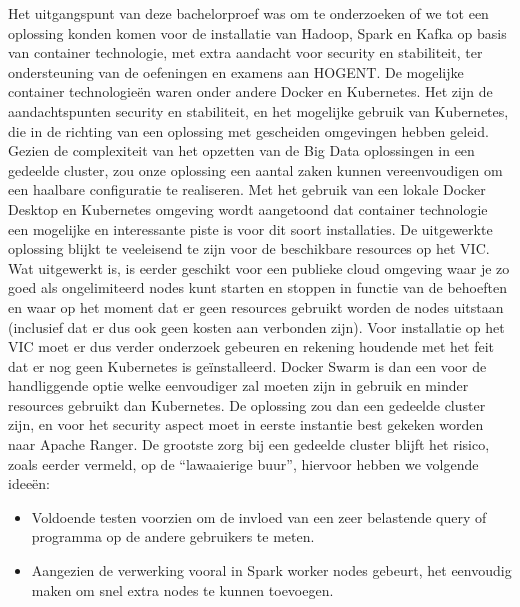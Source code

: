 Het uitgangspunt van deze bachelorproef was om te onderzoeken of we tot een oplossing konden komen voor de installatie van Hadoop, Spark en Kafka op basis van container technologie, met extra aandacht voor security en stabiliteit, ter ondersteuning van de oefeningen en examens aan HOGENT.
\newline
De mogelijke container technologieën waren onder andere Docker en Kubernetes.
\newline
\newline
Het zijn de aandachtspunten security en stabiliteit, en het mogelijke gebruik van Kubernetes, die in de richting van een oplossing met gescheiden omgevingen hebben geleid. 
\newline
\newline
Gezien de complexiteit van het opzetten van de Big Data oplossingen in een gedeelde cluster, zou onze oplossing een aantal zaken kunnen
vereenvoudigen om een haalbare configuratie te realiseren.
\newline
\newline
Met het gebruik van een lokale Docker Desktop en Kubernetes omgeving wordt aangetoond dat container technologie een mogelijke en interessante piste is voor dit soort installaties.
\newline
\newline
De uitgewerkte oplossing blijkt te veeleisend te zijn voor de beschikbare resources op het VIC. Wat uitgewerkt is, is eerder geschikt voor een publieke cloud omgeving waar je zo goed als ongelimiteerd nodes kunt starten en stoppen in functie van de behoeften en waar op het moment dat er geen resources gebruikt worden de nodes uitstaan (inclusief dat er dus ook geen kosten aan verbonden zijn).
\newline
\newline
Voor installatie op het VIC moet er dus verder onderzoek gebeuren en rekening houdende met het feit dat er nog geen Kubernetes is geïnstalleerd. Docker Swarm is dan een voor de handliggende optie welke eenvoudiger zal moeten zijn in gebruik en minder resources gebruikt dan Kubernetes.
\newline
De oplossing zou dan een gedeelde cluster zijn, en voor het security aspect moet in eerste instantie best gekeken worden naar Apache Ranger.
\newline
De grootste zorg bij een gedeelde cluster blijft het risico, zoals eerder vermeld, op de ``lawaaierige buur'', hiervoor hebben we volgende ideeën:
\newline
\begin{itemize}
    \item Voldoende testen voorzien om de invloed van een zeer belastende query of programma op de andere gebruikers te meten.
    \item Aangezien de verwerking vooral in Spark worker nodes gebeurt, het eenvoudig maken om snel extra nodes te kunnen toevoegen.
\end{itemize}

